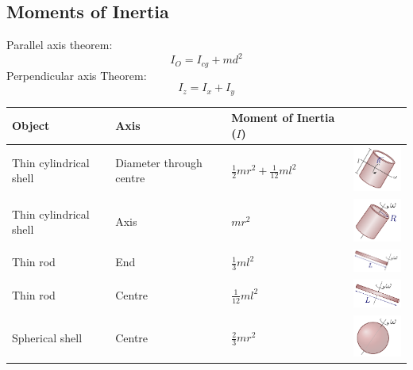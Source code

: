 \documentclass[12pt,a4paper]{article}
\begin{document}
	

	
\subsection*{Moments of Inertia}

Parallel axis theorem:
\begin{equation}
	I_O = I_{cg} + m d^2
\end{equation}
Perpendicular axis Theorem: 
\begin{equation}
	I_{z}=I_{x}+I_{y}
\end{equation}

\renewcommand{\arraystretch}{1.5} %
\begin{tabular}{l|llc}
	\textbf{Object} & \textbf{Axis} & \textbf{Moment of Inertia (\( I \))} &\\
	\hline
	Thin cylindrical shell & Diameter through centre & \( \frac{1}{2} m r^2 + \frac{1}{12}ml^2\) & 		\includegraphics[width=2cm]{moiThinSphereDiam.pdf}\\
	\hline
	
	Thin cylindrical shell & Axis & \( mr^2\) & \includegraphics[width=2cm]{page0009.pdf}\\
	\hline
	
	Thin rod & End & \( \frac{1}{3} m l^2 \) &\includegraphics[width=2cm]{page0003.pdf}\\
	\hline
	
	Thin rod & Centre & \( \frac{1}{12} m l^2 \) &\includegraphics[width=2cm]{page0002.pdf}\\
	\hline
	
	Spherical shell & Centre & \( \frac{2}{3} m r^2 \) &\includegraphics[width=2cm]{page0011.pdf}\\
	\hline
	

\end{tabular}
\end{document}

